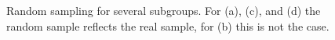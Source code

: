 \begin{center}
\begin{figure}[H]
		\caption[Random sampling]{Random sampling for several subgroups. For (a), (c), and (d) the random sample reflects the real sample, for (b) this is not the case.}
		\label{fig:RSadd}
	\end{figure}
\end{center}



